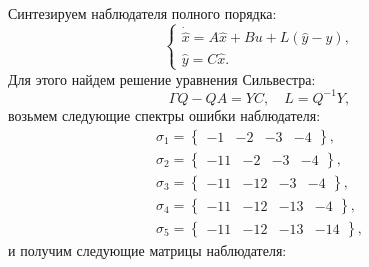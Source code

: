 Синтезируем наблюдателя полного порядка:
\begin{equation}
    \label{eq:3.3.estfull}
    \begin{cases}
        \dot{\hat x}=A\hat x+Bu+L(\hat y-y),\\
        \hat y=C\hat x.
    \end{cases}
\end{equation}
Для этого найдем решение уравнения Сильвестра:
\begin{equation*}
    \Gamma Q-QA=YC,\quad L=Q^{-1}Y,
\end{equation*}
возьмем следующие спектры ошибки наблюдателя:
\begin{gather*}
    \sigma_1=\left\{ \begin{array}{cccc}
        -1&-2&-3&-4
    \end{array} \right\},\\
    \sigma_2=\left\{ \begin{array}{cccc}
        -11&-2&-3&-4
    \end{array} \right\},\\
    \sigma_3=\left\{ \begin{array}{cccc}
        -11&-12&-3&-4
    \end{array} \right\},\\
    \sigma_4=\left\{ \begin{array}{cccc}
        -11&-12&-13&-4
    \end{array} \right\},\\
    \sigma_5=\left\{ \begin{array}{cccc}
        -11&-12&-13&-14
    \end{array} \right\},
\end{gather*}
и получим следующие матрицы наблюдателя:
